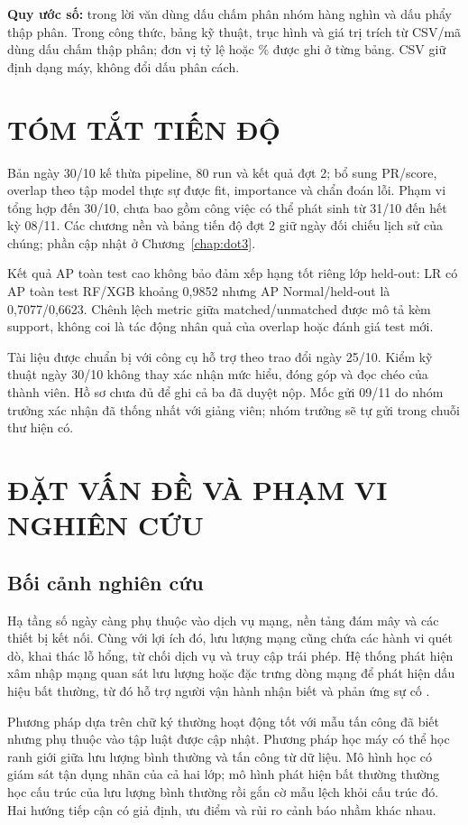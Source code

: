 \documentclass[12pt,a4paper,oneside]{report}
\begin{document}
\textbf{Quy ước số:} trong lời văn dùng dấu chấm phân nhóm hàng nghìn và dấu phẩy thập phân. Trong công thức, bảng kỹ thuật, trục hình và giá trị trích từ CSV/mã dùng dấu chấm thập phân; đơn vị tỷ lệ hoặc \% được ghi ở từng bảng. CSV giữ định dạng máy, không đổi dấu phân cách.
\clearpage
\chapter*{TÓM TẮT TIẾN ĐỘ}
Bản ngày 30/10 kế thừa pipeline, 80 run và kết quả đợt 2; bổ sung PR/score, overlap theo tập model thực sự được fit, importance và chẩn đoán lỗi. Phạm vi tổng hợp đến 30/10, chưa bao gồm công việc có thể phát sinh từ 31/10 đến hết kỳ 08/11. Các chương nền và bảng tiến độ đợt 2 giữ ngày đối chiếu lịch sử của chúng; phần cập nhật ở Chương~\ref{chap:dot3}.

Kết quả AP toàn test cao không bảo đảm xếp hạng tốt riêng lớp held-out: LR có AP toàn test RF/XGB khoảng 0,9852 nhưng AP Normal/held-out là 0,7077/0,6623. Chênh lệch metric giữa matched/unmatched được mô tả kèm support, không coi là tác động nhân quả của overlap hoặc đánh giá test mới.

Tài liệu được chuẩn bị với công cụ hỗ trợ theo trao đổi ngày 25/10. Kiểm kỹ thuật ngày 30/10 không thay xác nhận mức hiểu, đóng góp và đọc chéo của thành viên. Hồ sơ chưa đủ để ghi cả ba đã duyệt nộp. Mốc gửi 09/11 do nhóm trưởng xác nhận đã thống nhất với giảng viên; nhóm trưởng sẽ tự gửi trong chuỗi thư hiện có.

\clearpage{}
\chapter{ĐẶT VẤN ĐỀ VÀ PHẠM VI NGHIÊN CỨU}

\section{Bối cảnh nghiên cứu}

Hạ tầng số ngày càng phụ thuộc vào dịch vụ mạng, nền tảng đám mây và các thiết bị kết nối. Cùng với lợi ích đó, lưu lượng mạng cũng chứa các hành vi quét dò, khai thác lỗ hổng, từ chối dịch vụ và truy cập trái phép. Hệ thống phát hiện xâm nhập mạng quan sát lưu lượng hoặc đặc trưng dòng mạng để phát hiện dấu hiệu bất thường, từ đó hỗ trợ người vận hành nhận biết và phản ứng sự cố \cite{nist80094}.

Phương pháp dựa trên chữ ký thường hoạt động tốt với mẫu tấn công đã biết nhưng phụ thuộc vào tập luật được cập nhật. Phương pháp học máy có thể học ranh giới giữa lưu lượng bình thường và tấn công từ dữ liệu. Mô hình học có giám sát tận dụng nhãn của cả hai lớp; mô hình phát hiện bất thường thường học cấu trúc của lưu lượng bình thường rồi gắn cờ mẫu lệch khỏi cấu trúc đó. Hai hướng tiếp cận có giả định, ưu điểm và rủi ro cảnh báo nhầm khác nhau.
\end{document}
